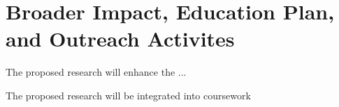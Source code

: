 \section{Broader Impact, Education Plan, and Outreach Activites}\label{sec:impacts}

 The proposed research will enhance the ...

 The proposed research will be integrated into coursework



